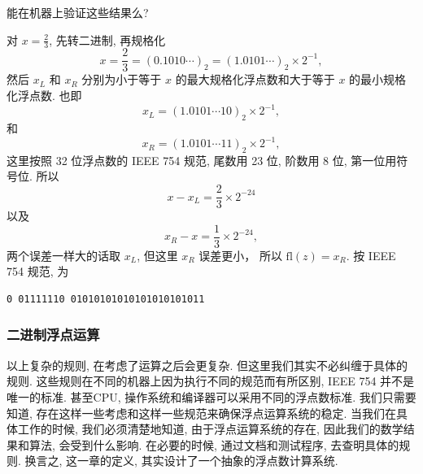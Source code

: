\documentclass[a4paper]{ctexart}
\begin{document}
{ 能在机器上验证这些结果么?

对 $x = \frac{2}{3}$, 先转二进制, 再规格化
$$
x = \frac{2}{3} = (0.1010\cdots)_2 = (1.0101\cdots)_2 \times 2^{-1},
$$
然后 $x_L$ 和 $x_R$ 分别为小于等于 $x$ 的最大规格化浮点数和大于等于
$x$ 的最小规格化浮点数. 也即
$$
x_L = (1.0101\cdots10)_2 \times 2^{-1},
$$
和
$$
x_R = (1.0101\cdots11)_2 \times 2^{-1},
$$
这里按照 32 位浮点数的 IEEE 754 规范, 尾数用 23 位, 阶数用 8 位, 第一位用符号位.
所以
$$
x - x_L = \frac{2}{3} \times 2^{-24}
$$
以及
$$
x_R - x = \frac{1}{3} \times 2^{-24},
$$
两个误差一样大的话取 $x_L$, 但这里 $x_R$ 误差更小，
所以 $\mbox{fl}(z) = x_R$. 按 IEEE 754 规范, 为
\begin{verbatim}
0 01111110 01010101010101010101011
\end{verbatim}


\subsubsection{二进制浮点运算}
以上复杂的规则, 在考虑了运算之后会更复杂. 但这里我们其实不必纠缠于具体的规则.
这些规则在不同的机器上因为执行不同的规范而有所区别, IEEE 754 并不是唯一的标准.
甚至CPU, 操作系统和编译器可以采用不同的浮点数标准. 
我们只需要知道, 存在这样一些考虑和这样一些规范来确保浮点运算系统的稳定.
当我们在具体工作的时候, 我们必须清楚地知道, 由于浮点运算系统的存在,
因此我们的数学结果和算法, 会受到什么影响. 在必要的时候, 通过文档和测试程序,
去查明具体的规则. 换言之, 这一章的定义, 其实设计了一个抽象的浮点数计算系统.


}
\end{document}

